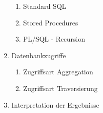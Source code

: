\begin{enumerate}
\begin{enumerate}[label*=\arabic*.]
\begin{enumerate}[label*=\arabic*.]
            	\item Standard SQL 
            	\item Stored Procedures
            	\item PL/SQL - Recursion
            \end{enumerate}
            \item Datenbankzugriffe
            \begin{enumerate}[label*=\arabic*.]
            	\item Zugriffsart Aggregation
            	\item Zugriffsart Traversierung
            \end{enumerate}
            \item Interpretation der Ergebnisse
        \end{enumerate}
    \end{enumerate}

